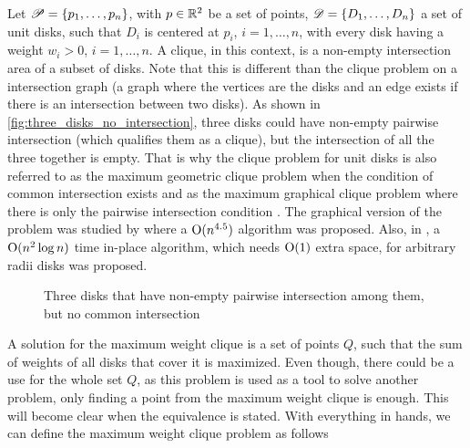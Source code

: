 Let $\mathscr{P}=\{p_1,\dots,p_n\}$, with $p\in \mathbb{R}^2$ be a set of points, $\mathscr{D}=\{D_1,\dots,D_n\}$ a set of unit disks, such that $D_i$ is centered at $p_i$, $i=1,\dots,n$, with every disk having a weight $w_i > 0$, $i=1,\dots,n$. A clique, in this context, is a non-empty intersection area of a subset of disks. Note that this is different than the clique problem on a intersection graph (a graph where the vertices are the disks and an edge exists if there is an intersection between two disks). As shown in \autoref{fig:three_disks_no_intersection}, three disks could have non-empty pairwise intersection (which qualifies them as a clique), but the intersection of all the three together is empty. That is why the clique problem for unit disks is also referred to as the maximum geometric clique problem when the condition of common intersection exists and as the maximum graphical clique problem where there is only the pairwise intersection condition \cite{inplace:2014}. The graphical version of the problem was studied by \cite{graphical-clique} where a $\mathrm{O}(n^{4.5})$ algorithm was proposed. Also, in \cite{inplace:2014}, a $\mathrm{O}(n^2\log{n})$ time in-place algorithm, which needs $\mathrm{O}(1)$ extra space, for arbitrary radii disks was proposed.

\begin{figure}[H]
\centering

    \caption{Three disks that have non-empty pairwise intersection among them, but no common intersection}
    \label{fig:three_disks_no_intersection}
    \fautor
\end{figure}


A solution for the maximum weight clique is a set of points $Q$, such that the sum of weights of all disks that cover it is maximized. Even though, there could be a use for the whole set $Q$, as this problem is used as a tool to solve another problem, only finding a point from the maximum weight clique is enough. This will become clear when the equivalence is stated. With everything in hands, we can define the maximum weight clique problem as follows

